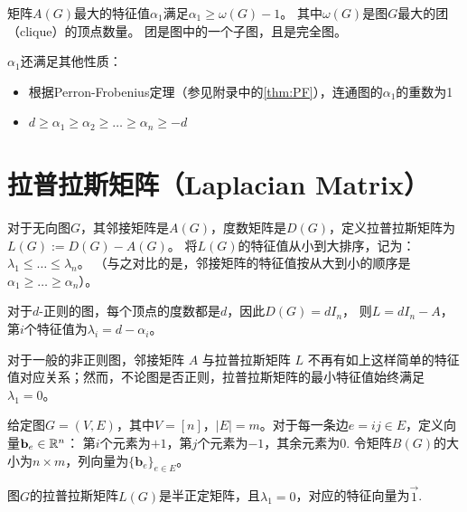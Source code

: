\begin{corollary}
    矩阵$A(G)$最大的特征值$\alpha_1$满足$\alpha_1\ge\omega(G)-1$。
    其中$\omega(G)$是图$G$最大的团（clique）的顶点数量。
    团是图中的一个子图，且是完全图。
\end{corollary}

$\alpha_1$还满足其他性质：
\begin{itemize}
    \item 根据Perron-Frobenius定理（参见附录中的\cref{thm:PF}），连通图的$\alpha_1$的重数为1
    \item $d\ge\alpha_1\ge\alpha_2\ge\dots\ge\alpha_n\ge-d$
\end{itemize}





\section{拉普拉斯矩阵（Laplacian Matrix）}

对于无向图$G$，其邻接矩阵是$A(G)$，度数矩阵是$D(G)$，定义拉普拉斯矩阵为$L(G):=D(G)-A(G)$。
将$L(G)$的特征值从小到大排序，记为：$\lambda_1\le\dots\le\lambda_n$。
（与之对比的是，邻接矩阵的特征值按从大到小的顺序是$\alpha_1\ge\dots\ge\alpha_n$）。

\example 对于$d$-正则的图，每个顶点的度数都是$d$，因此$D(G)=dI_n$，
则$L=dI_n-A$，第$i$个特征值为$\lambda_i=d-\alpha_i$。

对于一般的非正则图，邻接矩阵 $A$ 与拉普拉斯矩阵 $L$ 不再有如上这样简单的特征值对应关系；然而，不论图是否正则，拉普拉斯矩阵的最小特征值始终满足 $\lambda_1=0$。

\begin{definition}\label{def:incidence}
    给定图$G=(V,E)$，其中$V=[n]$，$|E|=m$。对于每一条边$e=ij\in E$，定义向量$\mathbf{b}_e\in\mathbb{R}^n$：
    第$i$个元素为$+1$，第$j$个元素为$-1$，其余元素为0.
    令矩阵$B(G)$的大小为$n\times m$，列向量为$\{\mathbf{b}_e\}_{e\in E}$。
\end{definition}

\begin{lemma}
    图$G$的拉普拉斯矩阵$L(G)$是半正定矩阵，且$\lambda_1=0$，对应的特征向量为$\vec{1}$.
\end{lemma}

